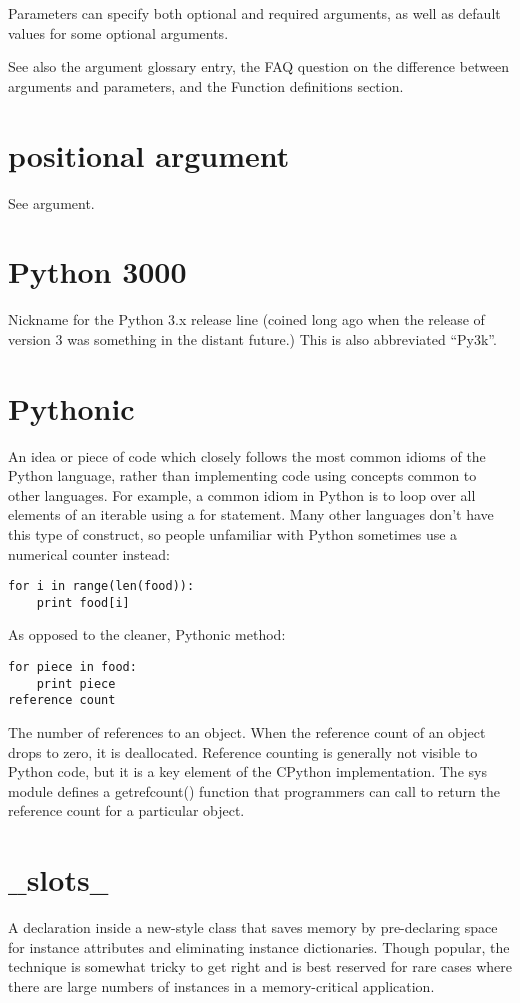 \documentclass[12pt,a4paper,final,twoside,onecolumn,titlepage]{book}
\begin{document}
Parameters can specify both optional and required arguments, as well as default values for some optional arguments.

See also the argument glossary entry, the FAQ question on the difference between arguments and parameters, and the Function definitions section.

\section{positional argument}
See argument.

\section{Python 3000}
Nickname for the Python 3.x release line (coined long ago when the release of version 3 was something in the distant future.) This is also abbreviated “Py3k”.

\section{Pythonic}
An idea or piece of code which closely follows the most common idioms of the Python language, rather than implementing code using concepts common to other languages. For example, a common idiom in Python is to loop over all elements of an iterable using a for statement. Many other languages don’t have this type of construct, so people unfamiliar with Python sometimes use a numerical counter instead:
\begin{lstlisting}
for i in range(len(food)):
    print food[i]
\end{lstlisting}
As opposed to the cleaner, Pythonic method:
\begin{lstlisting}
for piece in food:
    print piece
reference count
\end{lstlisting}
The number of references to an object. When the reference count of an object drops to zero, it is deallocated. Reference counting is generally not visible to Python code, but it is a key element of the CPython implementation. The sys module defines a getrefcount() function that programmers can call to return the reference count for a particular object.
\section{$\_\_$slots$\_\_$}
A declaration inside a new-style class that saves memory by pre-declaring space for instance attributes and eliminating instance dictionaries. Though popular, the technique is somewhat tricky to get right and is best reserved for rare cases where there are large numbers of instances in a memory-critical application.
\end{document}
